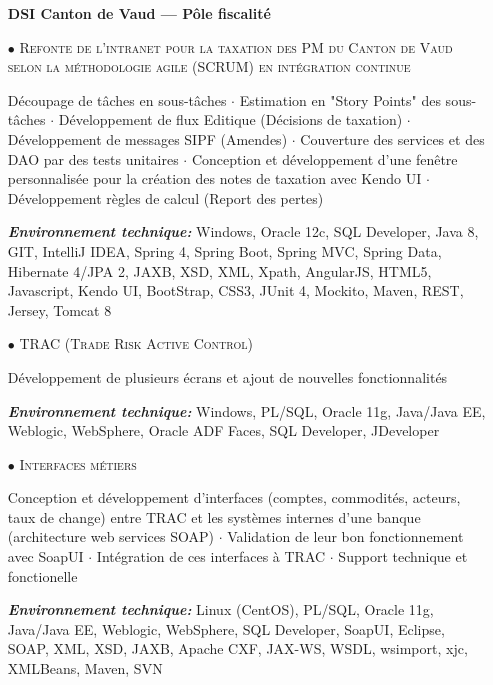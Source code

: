 \documentclass[10pt,a4paper]{moderncv}
\begin{document}
\vspace{1cm}

\begin{itemize}

	\item[] \textbf{DSI Canton de Vaud --- Pôle fiscalité}
	
	\item[$\bullet$] \textsc{Refonte de l’intranet pour la taxation des PM du Canton de Vaud selon la méthodologie agile (SCRUM) en intégration continue}
	\item[] Découpage de tâches en sous-tâches $\cdot$ Estimation en "Story Points" des sous-tâches $\cdot$ Développement de flux Editique (Décisions de taxation) $\cdot$ Développement de messages SIPF (Amendes) $\cdot$ Couverture des services et des DAO par des tests unitaires $\cdot$ Conception et développement d'une fenêtre personnalisée pour la création des notes de taxation avec Kendo UI $\cdot$ Développement règles de calcul (Report des pertes)
	\item[] \emph{\textbf{Environnement technique:}} Windows, Oracle 12c, SQL Developer, Java 8, GIT, IntelliJ IDEA, Spring 4, Spring Boot, Spring MVC, Spring Data, Hibernate 4/JPA 2, JAXB, XSD, XML, Xpath, AngularJS, HTML5, Javascript, Kendo UI, BootStrap, CSS3, JUnit 4, Mockito, Maven, REST, Jersey, Tomcat 8	
\end{itemize}


\clearpage

\begin{itemize}
		
	\item[$\bullet$] \textsc{TRAC (Trade Risk Active Control)}
	\item[] Développement de plusieurs écrans et ajout de nouvelles fonctionnalités		
	\item[] \emph{\textbf{Environnement technique:}} Windows, PL/SQL, Oracle 11g, Java/Java EE, Weblogic, WebSphere, Oracle ADF Faces, SQL Developer, JDeveloper

	\item[$\bullet$] \textsc{Interfaces métiers}
	\item[] Conception et développement d'interfaces (comptes, commodités, acteurs, taux de change) entre TRAC et les systèmes internes d'une banque (architecture web services SOAP) $\cdot$ Validation de leur bon fonctionnement avec SoapUI $\cdot$ Intégration de ces interfaces à TRAC $\cdot$  Support technique et fonctionelle
	\item[] \emph{\textbf{Environnement technique:}} Linux (CentOS), PL/SQL, Oracle 11g, Java/Java EE, Weblogic, WebSphere, SQL Developer, SoapUI, Eclipse, SOAP, XML, XSD, JAXB, Apache CXF, JAX-WS, WSDL, wsimport, xjc, XMLBeans, Maven, SVN	      	      	
\end{itemize}
\end{document}
